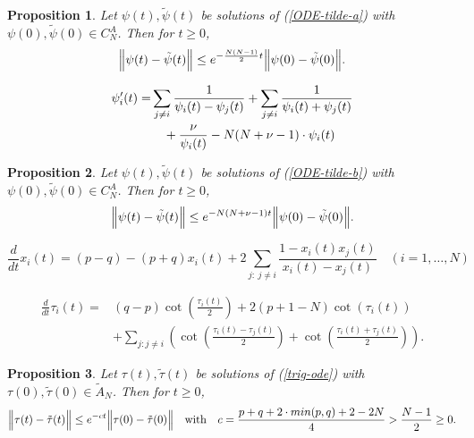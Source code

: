\documentclass[10pt,a4paper]{amsart}
\newtheorem{proposition}{Proposition}
\begin{document}
\begin{proposition}\label{decreasing-error-a-stat}
  Let  $\psi(t),\tilde \psi(t)$ be solutions of (\ref{ODE-tilde-a}) with $\psi(0),\tilde \psi(0)\in C_N^A$.
Then for $t\ge0$,
  $$\Bigl\|\psi(t)-\tilde \psi(t)\Bigr\|\le  e^{- \frac{N(N-1)}{2} t}\Bigl\|\psi(0)-\tilde \psi(0)\Bigr\|.$$ 
 \end{proposition}

\begin{align}\label{ODE-tilde-b}
{\psi}_i^\prime(t) = &\sum_{j\ne i}  \frac{1}{\psi_{i}(t)-\psi_{j}(t)}+
\sum_{j\ne i}  \frac{1}{\psi_{i}(t)+\psi_{j}(t)}
 \notag\\
&\quad
+\frac{ \nu}{  \psi_{i}(t)} -   N(N+\nu-1)\cdot \psi_{i}(t)
\end{align}

\begin{proposition}\label{decreasing-error-b-stat}
  Let  $\psi(t),\tilde \psi(t)$ be solutions of (\ref{ODE-tilde-b}) with $\psi(0),\tilde \psi(0)\in C_N^A$.
Then for $t\ge0$,
  $$\Bigl\|\psi(t)-\tilde \psi(t)\Bigr\|\le  e^{- N(N+\nu-1) t}\Bigl\|\psi(0)-\tilde \psi(0)\Bigr\|.$$ 
 \end{proposition}

\begin{equation}\label{ODE-jacobi}
\frac{d}{dt}x_i(t)
		=(p-q)-(p+q)x_i(t)
			+2\sum_{j:\> j\neq i}\frac{1-x_i(t)
			x_j(t)}{x_i(t)-x_j(t)}\quad ( i=1,\dots,N)
\end{equation}

   \begin{equation}\label{trig-ode}
        \begin{split}
        \frac{d}{dt} \tau_i(t)=&
           (q-p)\cot\left(\frac{\tau_i(t)}{2}\right)+2(p+1-N) \cot(\tau_i(t))\\
          &+\sum_{j: j\ne i}\left(\cot\left(\frac{\tau_i(t)-\tau_j(t)}{2}\right)+
          \cot\left(\frac{\tau_i(t)+\tau_j(t)}{2}\right)\right).
          \end{split}
          \end{equation}

 \begin{proposition}\label{decreasing-error-jacobi-stat-trigono}
  Let  $\tau(t),\tilde \tau(t)$ be solutions of (\ref{trig-ode}) with $\tau(0),\tilde \tau(0)\in \tilde A_N$.
Then for $t\ge0$,
$$\Bigl\|\tau(t)-\tilde \tau(t)\Bigr\|\le  e^{- c  t}\Bigl\|\tau(0)-\tilde \tau(0)\Bigr\|  \quad\text{with}\quad
c=\frac{p+q+2\cdot min(p,q)+2-2N}{4}>\frac{N-1}{2}\ge0.$$ 
  \end{proposition}
\end{document}
